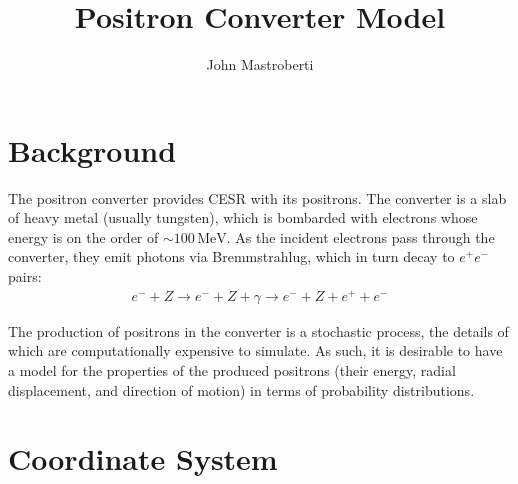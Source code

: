 \documentclass[12pt]{article}
\newcommand{\MeV}{\, \mathrm{MeV}}
\begin{document}
\title{Positron Converter Model}
\author{John Mastroberti}

\maketitle

\newcommand{\dxds}{\frac{dx'}{ds}}
\newcommand{\dyds}{\frac{dy'}{ds}}

\section{Background}
\label{s:background}

The positron converter provides CESR with its positrons.
The converter is a slab of heavy metal (usually tungsten), which is bombarded with electrons whose energy is on the order of $\sim 100 \MeV$.
As the incident electrons pass through the converter, they emit photons via Bremmstrahlug, which in turn decay to $e^+ e^-$ pairs:
\begin{align*}
e^- + Z \rightarrow e^- + Z + \gamma \rightarrow e^- + Z + e^+ + e^-
\end{align*}

The production of positrons in the converter is a stochastic process, the details of which are computationally expensive to simulate.
As such, it is desirable to have a model for the properties of the produced positrons (their energy, radial displacement, and direction of motion) in terms of probability distributions.

\section{Coordinate System}
\label{s:coords}
\end{document}

